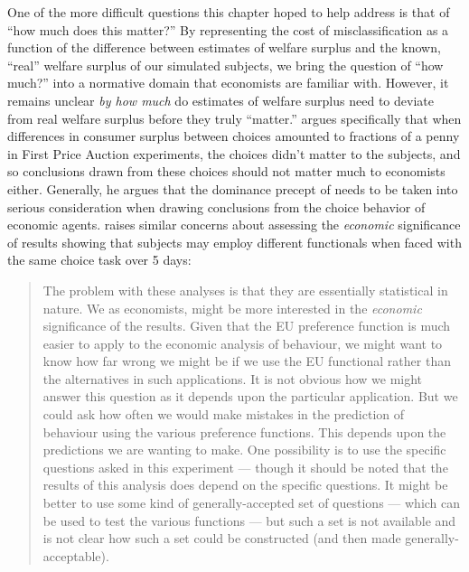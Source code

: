 \documentclass[../main.tex]{subfiles}
\begin{document}
One of the more difficult questions this chapter hoped to help address is that of \enquote{how much does this matter?}
By representing the cost of misclassification as a function of the difference between estimates of welfare surplus and the known, \enquote{real} welfare surplus of our simulated subjects, we bring the question of \enquote{how much?} into a normative domain that economists are familiar with.
However, it remains unclear \textit{by how much} do estimates of welfare surplus need to deviate from real welfare surplus before they truly \enquote{matter.}
\textcite{Harrison1989, Harrison1992} argues specifically that when differences in consumer surplus between choices amounted to fractions of a penny in First Price Auction experiments, the choices didn't matter to the subjects, and so conclusions drawn from these choices should not matter much to economists either.
Generally, he argues that the dominance precept of \textcite{Smith1982} needs to be taken into serious consideration when drawing conclusions from the choice behavior of economic agents.
\textcite[21]{Hey2001} raises similar concerns about assessing the \textit{economic} significance of results showing that subjects may employ different functionals when faced with the same choice task over 5 days:

\blockquote{
	The problem with these analyses is that they are essentially statistical in nature.
	We as economists, might be more interested in the \textit{economic} significance of the results. 
	Given that the EU preference function is much easier to apply to the economic analysis of behaviour, we might want to know how far wrong we might be if we use the EU functional rather than the alternatives in such applications.
	It is not obvious how we might answer this question as it depends upon the particular application.
	But we could ask how often we would make mistakes in the prediction of behaviour using the various preference functions.
	This depends upon the predictions we are wanting to make.
	One possibility is to use the specific questions asked in this experiment --- though it should be noted that the results of this analysis does depend on the specific questions.
	It might be better to use some kind of generally-accepted set of questions --- which can be used to test the various functions --- but such a set is not available and is not clear how such a set could be constructed (and then made generally-acceptable).
}
\end{document}
